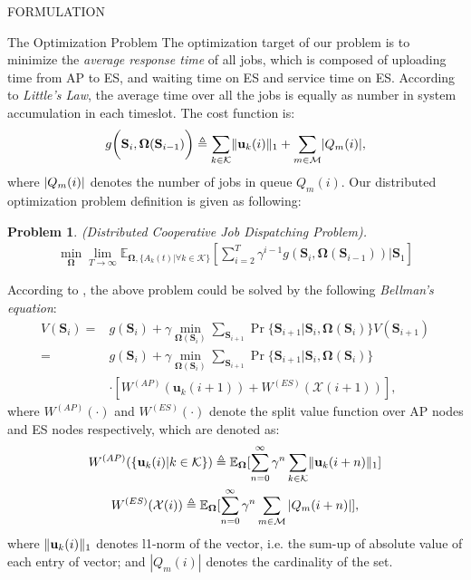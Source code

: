 \documentclass[10pt, conference, letterpaper]{IEEEtran}
\newtheorem{problem}{Problem}
\newcommand{\define}{\triangleq}
\renewcommand{\vec}{\mathbf}
\DeclarePairedDelimiter{\set}{\{}{\}}
\DeclarePairedDelimiter{\norm}{|}{|}
\DeclarePairedDelimiter{\Inorm}{\|}{\|_1}
\newcommand{\apSet}{\mathcal{K}}
\newcommand{\esSet}{\mathcal{M}}
\newcommand{\Stat}{\mathbf{S}}
\newcommand{\Obsv}{\mathcal{X}}
\newcommand{\Policy}{\mathbf{\Omega}}
\begin{document}
\begin{section}{FORMULATION}
        \begin{subsection}{The Optimization Problem}
            The optimization target of our problem is to minimize the \emph{average response time} of all jobs, which is composed of uploading time from AP to ES, and waiting time on ES and service time on ES. According to \emph{Little's Law}, the average time over all the jobs is equally as number in system accumulation in each timeslot. The cost function is:
            \begin{align}
                g \bigg( \Stat_{i}, \Policy(\Stat_{i-1}) \bigg) \define \sum_{k\in\apSet} \Inorm{\vec{u}_{k}(i)} + \sum_{m\in\esSet} \norm{Q_m(i)},
            \end{align}
            where $\norm{Q_m(i)}$ denotes the number of jobs in queue $Q_m(i)$.
            Our distributed optimization problem definition is given as following:
            \begin{problem}
                (Distributed Cooperative Job Dispatching Problem).
                \begin{gather}
                    \min_{\Policy} \lim_{T \to \infty}
                        \mathbb{E}_{\Policy, \{A_k(t)|\forall k\in\apSet\}}
                            [\sum_{i=2}^{T} \gamma^{i-1} g(\Stat_{i}, \Policy(\Stat_{i-1}))|\Stat_1]
                \end{gather}
            \end{problem}

            According to \cite{sutton1998introduction}, the above problem could be solved by the following \emph{Bellman's equation}:
            \begin{align}
                V(\Stat_{i}) =& g(\Stat_i) + \gamma \min_{\Policy(\Stat_{i})} \sum_{\Stat_{i+1}} \Pr\{ \Stat_{i+1}|\Stat_{i}, \Policy(\Stat_{i}) \} V(\Stat_{i+1})
                \nonumber\\
                =& g(\Stat_{i}) + \gamma \min_{\Policy(\Stat_{i})} \sum_{\Stat_{i+1}} \Pr\{ \Stat_{i+1}|\Stat_{i}, \Policy(\Stat_{i}) \}
                    \nonumber\\
                    & \cdot [W^{(AP)}(\vec{u}_k(i+1)) + W^{(ES)}(\Obsv(i+1))],
            \end{align}
            where $W^{(AP)}(\cdot)$ and $W^{(ES)}(\cdot)$ denote the split value function over AP nodes and ES nodes respectively, which are denoted as:
            \begin{gather}
                W^{(AP)}(\set{\vec{u}_k(i)|k\in\apSet}) \define \mathbb{E}_{\Policy}[\sum_{n=0}^{\infty} \gamma^{n} \sum_{k\in\apSet}\Inorm{\vec{u}_k(i+n)}]
                \\
                W^{(ES)}(\Obsv(i)) \define \mathbb{E}_{\Policy}[\sum_{n=0}^{\infty} \gamma^{n} \sum_{m\in\esSet}|Q_m(i+n)|],
            \end{gather}
            where $\Inorm{\vec{u}_k(i)}$ denotes l1-norm of the vector, i.e. the sum-up of absolute value of each entry of vector; and $|Q_m(i)|$ denotes the cardinality of the set.


\end{subsection}
\end{section}
\end{document}
